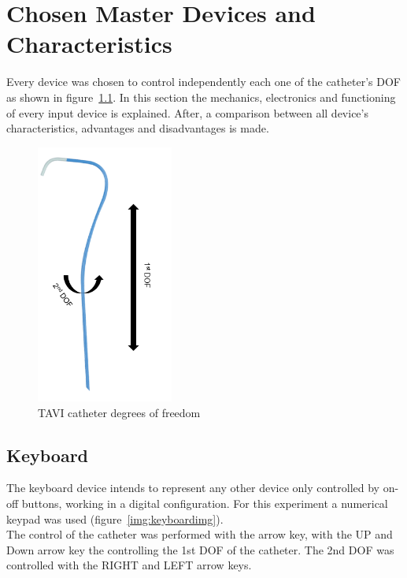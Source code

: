 
\chapter{Chosen Master Devices and Characteristics}\label{chosenDevices}
Every device was chosen to control independently each one of the catheter's DOF as shown in figure~\ref{img:dofi}. In this section the mechanics, electronics and functioning of every input device is explained. After, a comparison between all device's characteristics, advantages and disadvantages is made.

\begin{figure}[ht]
   \centering
   \includegraphics[width=0.4\textwidth]{img/Dof.PNG}
   \caption{TAVI catheter degrees of freedom}
   \label{img:dofi}
\end{figure}

\section{Keyboard}\label{sec:keyboard}
The keyboard device intends to represent any other device only controlled by on-off buttons, working in a digital configuration. For this experiment a numerical keypad was used (figure~\ref{img:keyboardimg}).\\

The control of the catheter was performed with the arrow key, with the UP and Down arrow key the controlling the 1st DOF of the catheter. The 2nd DOF was controlled with the RIGHT and LEFT arrow keys.\\

